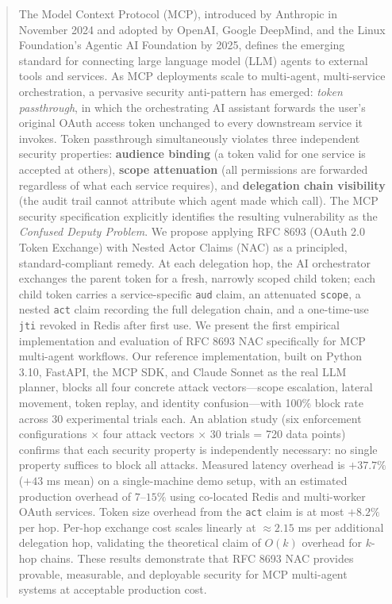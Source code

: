 \documentclass[journal]{IEEEtran}
\begin{document}
\begin{abstract}
The Model Context Protocol (MCP), introduced by Anthropic in November 2024 and adopted by OpenAI, Google DeepMind, and the Linux Foundation's Agentic AI Foundation by 2025, defines the emerging standard for connecting large language model (LLM) agents to external tools and services. As MCP deployments scale to multi-agent, multi-service orchestration, a pervasive security anti-pattern has emerged: \textit{token passthrough}, in which the orchestrating AI assistant forwards the user's original OAuth access token unchanged to every downstream service it invokes. Token passthrough simultaneously violates three independent security properties: \textbf{audience binding} (a token valid for one service is accepted at others), \textbf{scope attenuation} (all permissions are forwarded regardless of what each service requires), and \textbf{delegation chain visibility} (the audit trail cannot attribute which agent made which call). The MCP security specification explicitly identifies the resulting vulnerability as the \textit{Confused Deputy Problem}. We propose applying RFC 8693 (OAuth 2.0 Token Exchange) with Nested Actor Claims (NAC) as a principled, standard-compliant remedy. At each delegation hop, the AI orchestrator exchanges the parent token for a fresh, narrowly scoped child token; each child token carries a service-specific \texttt{aud} claim, an attenuated \texttt{scope}, a nested \texttt{act} claim recording the full delegation chain, and a one-time-use \texttt{jti} revoked in Redis after first use. We present the first empirical implementation and evaluation of RFC 8693 NAC specifically for MCP multi-agent workflows. Our reference implementation, built on Python 3.10, FastAPI, the MCP SDK, and Claude Sonnet as the real LLM planner, blocks all four concrete attack vectors—scope escalation, lateral movement, token replay, and identity confusion—with 100\% block rate across 30 experimental trials each. An ablation study (six enforcement configurations × four attack vectors × 30 trials = 720 data points) confirms that each security property is independently necessary: no single property suffices to block all attacks. Measured latency overhead is $+37.7\%$ ($+43$ ms mean) on a single-machine demo setup, with an estimated production overhead of $7$--$15\%$ using co-located Redis and multi-worker OAuth services. Token size overhead from the \texttt{act} claim is at most $+8.2\%$ per hop. Per-hop exchange cost scales linearly at $\approx 2.15$ ms per additional delegation hop, validating the theoretical claim of $O(k)$ overhead for $k$-hop chains. These results demonstrate that RFC 8693 NAC provides provable, measurable, and deployable security for MCP multi-agent systems at acceptable production cost.
\end{abstract}
\end{document}
